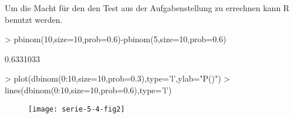 Um die Macht für den den Test aus der Aufgabenstellung zu errechnen
kann R benutzt werden.
\begin{Schunk}
\begin{Sinput}
> pbinom(10,size=10,prob=0.6)-pbinom(5,size=10,prob=0.6)
\end{Sinput}
\begin{Soutput}
[1] 0.6331033
\end{Soutput}
\end{Schunk}

\begin{Schunk}
\begin{Sinput}
> plot(dbinom(0:10,size=10,prob=0.3),type='l',ylab="P()")
> lines(dbinom(0:10,size=10,prob=0.6),type='l')
\end{Sinput}
\end{Schunk}

\begin{figure}[h]
	\begin{center}
\texttt{[image: serie-5-4-fig2]}
	\end{center}
\end{figure}

